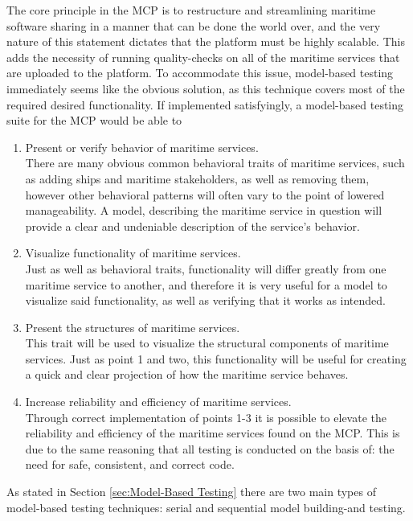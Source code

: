The core principle in the MCP is to restructure and streamlining maritime software sharing in a manner that can be done the world over, and the very nature of this statement dictates that the platform must be highly scalable. This adds the necessity of running quality-checks on all of the maritime services that are uploaded to the platform. To accommodate this issue, model-based testing immediately seems like the obvious solution, as this technique covers most of the required desired functionality. If implemented satisfyingly, a model-based testing suite for the MCP would be able to
\begin{enumerate}
	\item Present or verify behavior of maritime services.\\
	There are many obvious common behavioral traits of maritime services, such as adding ships and maritime stakeholders, as well as removing them, however other behavioral patterns will often vary to the point of lowered manageability. A model, describing the maritime service in question will provide a clear and undeniable description of the service's behavior.
	\item Visualize functionality of maritime services.\\
	Just as well as behavioral traits, functionality will differ greatly from one maritime service to another, and therefore it is very useful for a model to visualize said functionality, as well as verifying that it works as intended.
	\item Present the structures of maritime services.\\
	This trait will be used to visualize the structural components of maritime services. Just as point 1 and two, this functionality will be useful for creating a quick and clear projection of how the maritime service behaves.
	\item Increase reliability and efficiency of maritime services.\\
	Through correct implementation of points 1-3 it is possible to elevate the reliability and efficiency of the maritime services found on the MCP. This is due to the same reasoning that all testing is conducted on the basis of: the need for safe, consistent, and correct code.
\end{enumerate}

As stated in Section \ref{sec:Model-Based Testing} there are two main types of model-based testing techniques: serial and sequential model building-and testing. 


